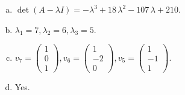 \begin{questions}
\begin{solution}
\begin{enumerate}[(a)]
\item $\det(A-\lambda I)=-{\lambda}^{3} + 18 \, {\lambda}^{2} - 107 \, {\lambda} + 210$.
\item ${\lambda}_1=7, {\lambda}_2=6, {\lambda}_3=5$.
\item $v_{7}=\left(\begin{array}{r}
1 \\
0 \\
1
\end{array}\right), v_{6}=\left(\begin{array}{r}
1 \\
-2 \\
0
\end{array}\right), v_{5}=\left(\begin{array}{r}
1 \\
-1 \\
1
\end{array}\right)$.
\item Yes.
\end{enumerate}
\end{solution}

\end{questions}

\newpage


\begin{center}
\end{center}

